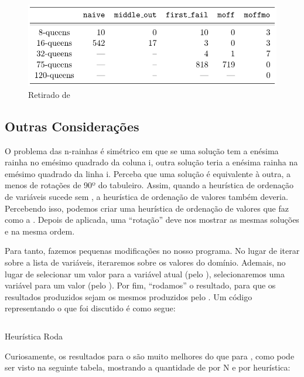 \begin{figure}[h]
  \caption{Retirado de \cite{krzysztof}}\label{fig:psi}
  \centering
  \includegraphics[scale=0.5]{HeuristicsBacktrack.png}
\end{figure}

\subsection{Outras Considerações}

O problema das n-rainhas é simétrico em que se uma solução tem a enésima rainha no emésimo quadrado da
coluna i, outra solução teria a enésima rainha na emésimo quadrado da linha i. Perceba que uma solução é
equivalente à outra, a menos de rotações de 90º do tabuleiro. Assim, quando a heurística de ordenação de
variáveis  sucede sem , a heurística de ordenação de
valores  também deveria. Percebendo isso, podemos criar uma heurística
de ordenação de valores que faz  como a . Depois de
aplicada, uma ``rotação'' deve nos mostrar as mesmas soluções e na mesma ordem.

Para tanto, fazemos pequenas modificações no nosso programa. No lugar de iterar sobre a lista de
variáveis, iteraremos sobre os valores do domínio. Ademais, no lugar de selecionar um valor para a
variável atual (pelo ), selecionaremos uma variável para um valor (pelo
). Por fim, ``rodamos'' o resultado, para que os resultados produzidos sejam os
mesmos produzidos pelo . Um código representando o que foi discutido é como
segue:

    \begin{listing}
\inputminted{prolog}{../Exemplos/Cap11/prog7_queensHeurRotate.ecl}
    \caption{Heurística Roda}
    \end{listing}

Curiosamente, os resultados para o  são muito melhores do que para
, como pode ser visto na seguinte tabela, mostrando a quantidade de
 por N e por heurística:

